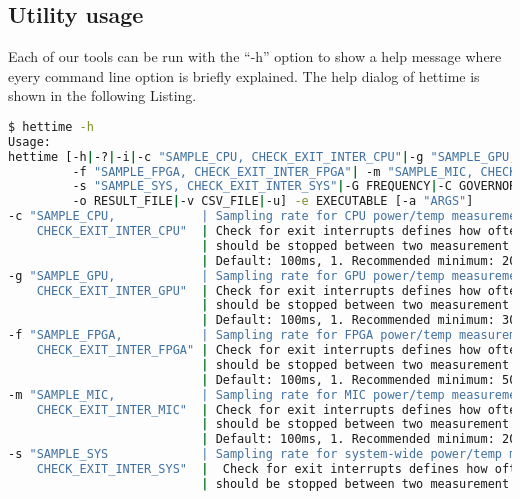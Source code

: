 \clearpage
\begin{landscape}
\section{Utility usage}
\label{app:manpage}
Each of our tools can be run with the ``-h'' option to show a help message where eyery command line option is briefly explained. The help dialog of hettime is shown in the following Listing.
\begin{lstlisting}[language=sh,stringstyle=\color{black},keywordstyle=\color{black}]
$ hettime -h
Usage:
hettime [-h|-?|-i|-c "SAMPLE_CPU, CHECK_EXIT_INTER_CPU"|-g "SAMPLE_GPU, CHECK_EXIT_INTER_GPU"|
		 -f "SAMPLE_FPGA, CHECK_EXIT_INTER_FPGA"| -m "SAMPLE_MIC, CHECK_EXIT_INTER_MIC"|
		 -s "SAMPLE_SYS, CHECK_EXIT_INTER_SYS"|-G FREQUENCY|-C GOVERNOR|-L FREQUENCY| -H FREQUENCY|
		 -o RESULT_FILE|-v CSV_FILE|-u] -e EXECUTABLE [-a "ARGS"]
-c "SAMPLE_CPU,            | Sampling rate for CPU power/temp measurements in ms.
    CHECK_EXIT_INTER_CPU"  | Check for exit interrupts defines how often it is checked whether the measurement
                           | should be stopped between two measurement points.
                           | Default: 100ms, 1. Recommended minimum: 20ms.
-g "SAMPLE_GPU,            | Sampling rate for GPU power/temp measurements in ms.
    CHECK_EXIT_INTER_GPU"  | Check for exit interrupts defines how often it is checked whether the measurement
                           | should be stopped between two measurement points.
                           | Default: 100ms, 1. Recommended minimum: 30ms.
-f "SAMPLE_FPGA,           | Sampling rate for FPGA power/temp measurements in ms.
    CHECK_EXIT_INTER_FPGA" | Check for exit interrupts defines how often it is checked whether the measurement
                           | should be stopped between two measurement points.
                           | Default: 100ms, 1. Recommended minimum: 50ms.
-m "SAMPLE_MIC,            | Sampling rate for MIC power/temp measurements in ms.
    CHECK_EXIT_INTER_MIC"  | Check for exit interrupts defines how often it is checked whether the measurement
                           | should be stopped between two measurement points.
                           | Default: 100ms, 1. Recommended minimum: 20ms.
-s "SAMPLE_SYS             | Sampling rate for system-wide power/temp measurements in ms.
    CHECK_EXIT_INTER_SYS"  |  Check for exit interrupts defines how often it is checked whether the measurement
                           | should be stopped between two measurement points.

\end{lstlisting}
\end{landscape}
